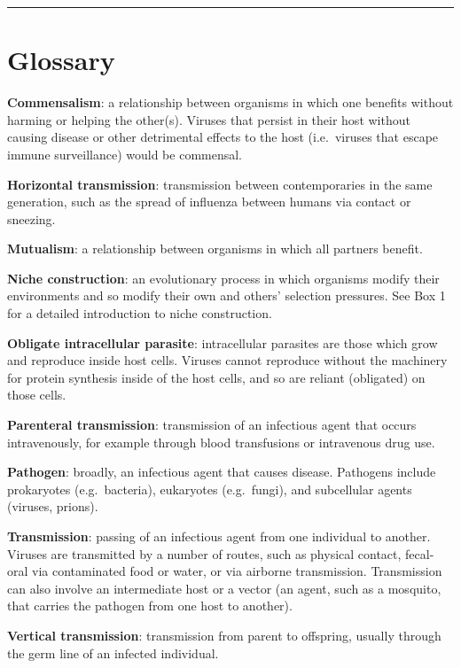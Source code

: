 \documentclass[review,draft,12pt]{elsarticle}
\begin{document}
\begin{center}\rule{3in}{0.4pt}\end{center}

\section{Glossary}\label{glossary}

\textbf{Commensalism}: a relationship between organisms in which one
benefits without harming or helping the other(s). Viruses that persist
in their host without causing disease or other detrimental effects to
the host (i.e.~viruses that escape immune surveillance) would be
commensal.

\textbf{Horizontal transmission}: transmission between contemporaries in
the same generation, such as the spread of influenza between humans via
contact or sneezing.

\textbf{Mutualism}: a relationship between organisms in which all
partners benefit.

\textbf{Niche construction}: an evolutionary process in which organisms
modify their environments and so modify their own and others' selection
pressures. See Box 1 for a detailed introduction to niche construction.

\textbf{Obligate intracellular parasite}: intracellular parasites are
those which grow and reproduce inside host cells. Viruses cannot
reproduce without the machinery for protein synthesis inside of the host
cells, and so are reliant (obligated) on those cells.

\textbf{Parenteral transmission}: transmission of an infectious agent
that occurs intravenously, for example through blood transfusions or
intravenous drug use.

\textbf{Pathogen}: broadly, an infectious agent that causes disease.
Pathogens include prokaryotes (e.g.~bacteria), eukaryotes (e.g.~fungi),
and subcellular agents (viruses, prions).

\textbf{Transmission}: passing of an infectious agent from one
individual to another. Viruses are transmitted by a number of routes,
such as physical contact, fecal-oral via contaminated food or water, or
via airborne transmission. Transmission can also involve an intermediate
host or a vector (an agent, such as a mosquito, that carries the
pathogen from one host to another).

\textbf{Vertical transmission}: transmission from parent to offspring,
usually through the germ line of an infected individual.
\end{document}

